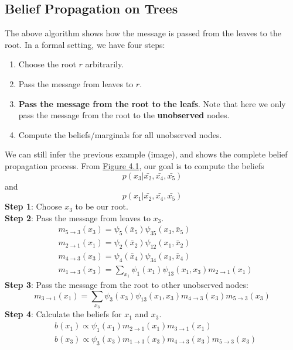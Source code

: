 \subsection{Belief Propagation on Trees}
The above algorithm shows how the message is passed from the leaves to the root. In a formal setting, we have four steps:
\begin{enumerate}
    \item Choose the root $r$ arbitrarily.
    \item Pass the message from leaves to $r$.
    \item \textbf{Pass the message from the root to the leafs}. Note that here we only pass the message from the root to the \textbf{unobserved} nodes.
    \item Compute the beliefs/marginals for all unobserved nodes. 
\end{enumerate}
\begin{example}
    We can still infer the previous example (image), and shows the complete belief propagation process. From \hyperref[fig:tree]{Figure 4.1}, our goal is to compute the beliefs
    $$p(x_3|\bar{x_2},\bar{x_4},\bar{x_5})$$ and $$p(x_1|\bar{x_2},\bar{x_4},\bar{x_5})$$
    \textbf{Step 1}: Choose $x_3$ to be our root.\\
    \textbf{Step 2}: Pass the message from leaves to $x_3$.
    \begin{align*}
        & m_{5 \rightarrow 3}\left(x_3\right)=\psi_5\left(\bar{x}_5\right) \psi_{35}\left(x_3, \bar{x}_5\right) \\
        & m_{2 \rightarrow 1}\left(x_1\right)=\psi_2\left(\bar{x}_2\right) \psi_{12}\left(x_1, \bar{x}_2\right) \\
        & m_{4 \rightarrow 3}\left(x_3\right)=\psi_4\left(\bar{x}_4\right) \psi_{34}\left(x_3, \bar{x}_4\right) \\
        & m_{1 \rightarrow 3}\left(x_3\right)=\sum_{x_1} \psi_1\left(x_1\right) \psi_{13}\left(x_1, x_3\right) m_{2 \rightarrow 1}\left(x_1\right)
        \end{align*}
    \textbf{Step 3}: Pass the message from the root to other unobserved nodes:
    $$m_{3 \rightarrow 1}\left(x_1\right)=\sum_{x_3} \psi_3\left(x_3\right) \psi_{13}\left(x_1, x_3\right) m_{4 \rightarrow 3}\left(x_3\right) m_{5 \rightarrow 3}\left(x_3\right)$$
    \textbf{Step 4}: Calculate the beliefs for $x_1$ and $x_3$.
    \begin{align*}
        & b\left(x_1\right) \propto \psi_1\left(x_1\right) m_{2 \rightarrow 1}\left(x_1\right) m_{3 \rightarrow 1}\left(x_1\right) \\
        & b\left(x_3\right) \propto \psi_3\left(x_3\right) m_{1 \rightarrow 3}\left(x_3\right) m_{4 \rightarrow 3}\left(x_3\right) m_{5 \rightarrow 3}\left(x_3\right)
    \end{align*}
\end{example}
